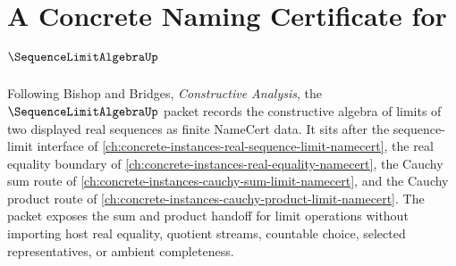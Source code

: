 \chapter{A Concrete Naming Certificate for $\SequenceLimitAlgebraUp$}
\label{ch:concrete-instances-sequence-limit-algebra-namecert}

Following Bishop and Bridges, \emph{Constructive Analysis}, the $\SequenceLimitAlgebraUp$ packet records the constructive algebra of limits of two displayed real sequences as finite NameCert data. It sits after the sequence-limit interface of \autoref{ch:concrete-instances-real-sequence-limit-namecert}, the real equality boundary of \autoref{ch:concrete-instances-real-equality-namecert}, the Cauchy sum route of \autoref{ch:concrete-instances-cauchy-sum-limit-namecert}, and the Cauchy product route of \autoref{ch:concrete-instances-cauchy-product-limit-namecert}. The packet exposes the sum and product handoff for limit operations without importing host real equality, quotient streams, countable choice, selected representatives, or ambient completeness.

